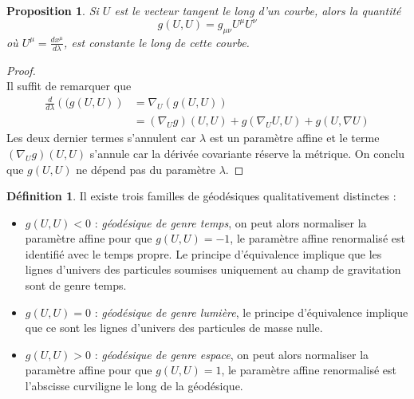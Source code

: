 \documentclass[a4paper,11pt]{report}
\theoremstyle{definition}
\theoremstyle{plain}
\newtheorem{prop}[thm]{Proposition}
\theoremstyle{definition}
\newtheorem{defn}{Définition}[chapter]
\theoremstyle{remark}
\begin{document}
            \begin{prop}
                Si $U$ est le vecteur tangent le long d'un courbe, alors la quantité
                \begin{equation}
                    g(U,U) = g_{\mu\nu}U^\mu U^\nu
                \end{equation}
                où $U^\mu = \frac{dx^\mu}{d\lambda}$, est constante le long de cette courbe.
            \end{prop}
            
            \begin{proof}${}$\\
                Il suffit de remarquer que
                \begin{align}
                    \frac{d}{d\lambda}\left((g(U,U)\right) &= \nabla_U\left(g(U,U)\right) \\
                    &= \left(\nabla_Ug\right)(U,U) + g(\nabla_U U,U) + g(U,\nabla U) 
                \end{align}
                Les deux dernier termes s'annulent car $\lambda$ est un paramètre affine et le terme $\left(\nabla_Ug\right)(U,U)$ s'annule car la dérivée covariante réserve la métrique. On conclu que $g(U,U)$ ne dépend pas du paramètre $\lambda$.
            \end{proof}
            
            \begin{defn}
                Il existe trois familles de géodésiques qualitativement distinctes :
                \begin{itemize}[label = \textbullet]
                    \item $g(U,U)<0$ : \textit{géodésique de genre temps}, on peut alors normaliser la paramètre affine pour que $g(U,U) = -1$, le paramètre affine renormalisé est identifié avec le temps propre. Le principe d'équivalence implique que les lignes d'univers des particules soumises uniquement au champ de gravitation sont de genre temps.
                    \item $g(U,U)=0$ : \textit{géodésique de genre lumière}, le principe d'équivalence implique que ce sont les lignes d'univers des particules de masse nulle.
                    \item $g(U,U)>0$ : \textit{géodésique de genre espace}, on peut alors normaliser la paramètre affine pour que $g(U,U) = 1$, le paramètre affine renormalisé est l'abscisse curviligne le long de la géodésique.
                \end{itemize}
            \end{defn}
            
\end{document}
